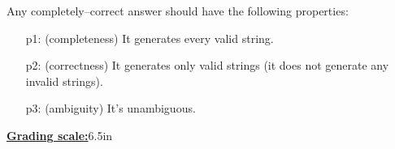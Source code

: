 \documentclass[11pt,fleqn]{article}
\begin{document}
\begin{enumerate}

          Any completely--correct answer should have the following
          properties:

          \vspace{-2mm}

          \begin{enumerate}

            \item[p1:] (completeness) It generates every valid
                       string.

            \item[p2:] (correctness) It generates only valid
                       strings (it does not generate any invalid strings).

            \item[p3:] (ambiguity) It's unambiguous.

          \end{enumerate}

          \vspace{-2mm}

          \begin{info}{\textbf{\underline{Grading scale:}}}{6.5in}


\end{info}
\end{enumerate}
\end{document}
